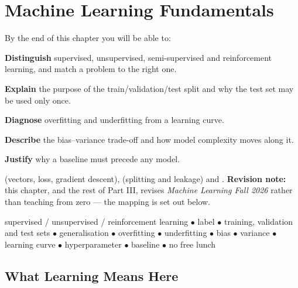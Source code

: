 \chapter{Machine Learning Fundamentals}\label{ch:mlfundamentals}

\begin{outcomes}
By the end of this chapter you will be able to:
\begin{tight}
  \item \textbf{Distinguish} supervised, unsupervised, semi-supervised and reinforcement learning, and match a problem to the right one.
  \item \textbf{Explain} the purpose of the train/validation/test split and why the test set may be used only once.
  \item \textbf{Diagnose} overfitting and underfitting from a learning curve.
  \item \textbf{Describe} the bias--variance trade-off and how model complexity moves along it.
  \item \textbf{Justify} why a baseline must precede any model.
\end{tight}
\end{outcomes}

\begin{prereq}
 (vectors, loss, gradient descent),  (splitting and
leakage) and . \textbf{Revision note:} this chapter, and the
rest of Part III, revises \emph{Machine Learning Fall 2026} rather than teaching
from zero --- the mapping is set out below.
\end{prereq}

\begin{keyterms}
supervised / unsupervised / reinforcement learning $\bullet$ label $\bullet$
training, validation and test sets $\bullet$ generalisation $\bullet$ overfitting
$\bullet$ underfitting $\bullet$ bias $\bullet$ variance $\bullet$ learning curve
$\bullet$ hyperparameter $\bullet$ baseline $\bullet$ no free lunch
\end{keyterms}

\section{What Learning Means Here}

